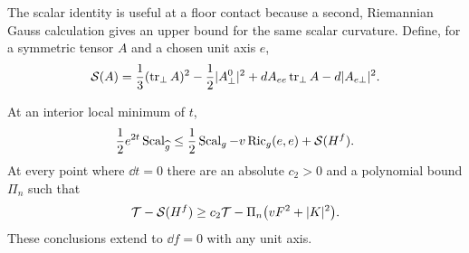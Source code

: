 The scalar identity is useful at a floor contact because a second,
Riemannian Gauss calculation gives an upper bound for the same scalar
curvature.  Define, for a symmetric tensor $A$ and a chosen unit axis $e$,
\begin{equation}\label{four:sys:gauss-quadratic}
 \mathcal S(A)=\frac13(\operatorname{tr}_\perp A)^2
       -\frac12|A_\perp^0|^2
       +d A_{ee}\operatorname{tr}_\perp A-d|A_{e\perp}|^2.
\end{equation}

\begin{lemma}\label{four:sys:gauss-lemma}
At an interior local minimum of $t$,
\begin{equation}\label{four:sys:gauss-bound}
 \frac12e^{2t}\operatorname{Scal}_{\widehat g}
 \le\frac12\operatorname{Scal}_g-v\operatorname{Ric}_g(e,e)+\mathcal S(H^f).
\end{equation}
At every point where $\dd t=0$ there are an absolute $c_2>0$ and a
polynomial bound $\Pi_n$ such that
\begin{equation}\label{four:sys:floor-coercivity}
 \mathcal T-\mathcal S(H^f)
          \ge c_2\mathcal T-\Pi_n\bigl(vF^2+|K|^2\bigr).
\end{equation}
These conclusions extend to $\dd f=0$ with any unit axis.
\end{lemma}


